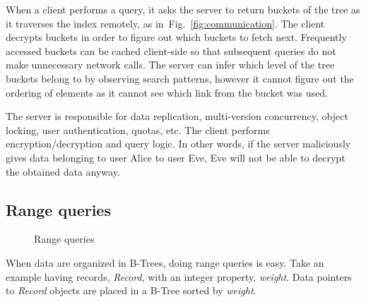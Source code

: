 \documentclass[notitlepage,longbibliography]{revtex4-1}
\newcommand{\figref}[1]{Fig.~\ref{#1}}
\begin{document}
When a client performs a query, it asks the server to return buckets of the tree as it traverses the index remotely, as in~\figref{fig:communication}.
The client decrypts buckets in order to figure out which buckets to fetch next.
Frequently accessed buckets can be cached client-side so that subsequent queries do not make unnecessary network calls.
The server can infer which level of the tree buckets belong to by observing search patterns,
however it cannot figure out the ordering of elements as it cannot see which link from the bucket was used.

The server is responsible for data replication, multi-version concurrency, object locking, user authentication, quotas, etc.
The client performs encryption/decryption and query logic.
In other words, if the server maliciously gives data belonging to user Alice to user Eve,
Eve will not be able to decrypt the obtained data anyway.

\subsection{Range queries}

\begin{figure}
	\begin{center}
        \qquad
	\end{center}
	\caption{Range queries}
	\label{fig:range-query}
\end{figure}

When data are organized in B-Trees, doing range queries is easy.
Take an example having records, \emph{Record}, with an integer property, \emph{weight}.
Data pointers to \emph{Record} objects are placed in a B-Tree sorted by \emph{weight}.
\end{document}
